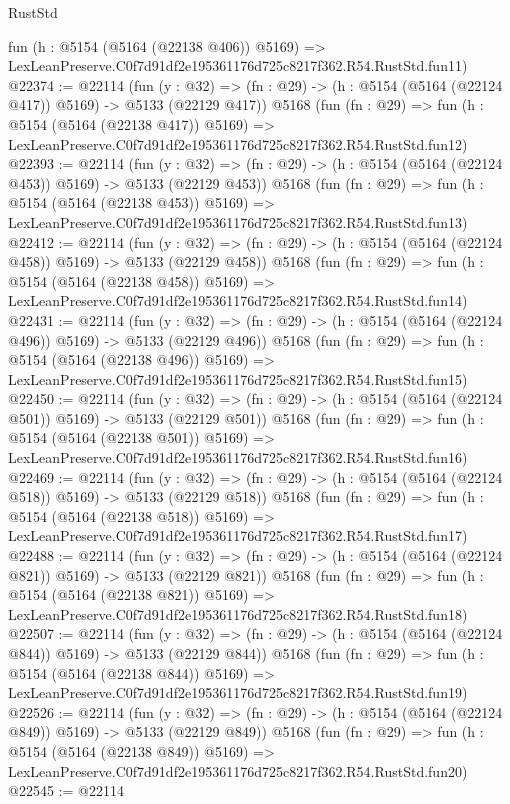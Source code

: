 \begin{lexlean}{RustStd}
\begin{coremodule}
    fun (h : @5154 (@5164 (@22138 @406)) @5169) =>
    LexLeanPreserve.C0f7d91df2e195361176d725c8217f362.R54.RustStd.fun11)
@22374 := @22114
    (fun (y : @32) => (fn : @29) -> (h : @5154 (@5164 (@22124 @417)) @5169) -> @5133 (@22129 @417))
    @5168
    (fun (fn : @29) =>
    fun (h : @5154 (@5164 (@22138 @417)) @5169) =>
    LexLeanPreserve.C0f7d91df2e195361176d725c8217f362.R54.RustStd.fun12)
@22393 := @22114
    (fun (y : @32) => (fn : @29) -> (h : @5154 (@5164 (@22124 @453)) @5169) -> @5133 (@22129 @453))
    @5168
    (fun (fn : @29) =>
    fun (h : @5154 (@5164 (@22138 @453)) @5169) =>
    LexLeanPreserve.C0f7d91df2e195361176d725c8217f362.R54.RustStd.fun13)
@22412 := @22114
    (fun (y : @32) => (fn : @29) -> (h : @5154 (@5164 (@22124 @458)) @5169) -> @5133 (@22129 @458))
    @5168
    (fun (fn : @29) =>
    fun (h : @5154 (@5164 (@22138 @458)) @5169) =>
    LexLeanPreserve.C0f7d91df2e195361176d725c8217f362.R54.RustStd.fun14)
@22431 := @22114
    (fun (y : @32) => (fn : @29) -> (h : @5154 (@5164 (@22124 @496)) @5169) -> @5133 (@22129 @496))
    @5168
    (fun (fn : @29) =>
    fun (h : @5154 (@5164 (@22138 @496)) @5169) =>
    LexLeanPreserve.C0f7d91df2e195361176d725c8217f362.R54.RustStd.fun15)
@22450 := @22114
    (fun (y : @32) => (fn : @29) -> (h : @5154 (@5164 (@22124 @501)) @5169) -> @5133 (@22129 @501))
    @5168
    (fun (fn : @29) =>
    fun (h : @5154 (@5164 (@22138 @501)) @5169) =>
    LexLeanPreserve.C0f7d91df2e195361176d725c8217f362.R54.RustStd.fun16)
@22469 := @22114
    (fun (y : @32) => (fn : @29) -> (h : @5154 (@5164 (@22124 @518)) @5169) -> @5133 (@22129 @518))
    @5168
    (fun (fn : @29) =>
    fun (h : @5154 (@5164 (@22138 @518)) @5169) =>
    LexLeanPreserve.C0f7d91df2e195361176d725c8217f362.R54.RustStd.fun17)
@22488 := @22114
    (fun (y : @32) => (fn : @29) -> (h : @5154 (@5164 (@22124 @821)) @5169) -> @5133 (@22129 @821))
    @5168
    (fun (fn : @29) =>
    fun (h : @5154 (@5164 (@22138 @821)) @5169) =>
    LexLeanPreserve.C0f7d91df2e195361176d725c8217f362.R54.RustStd.fun18)
@22507 := @22114
    (fun (y : @32) => (fn : @29) -> (h : @5154 (@5164 (@22124 @844)) @5169) -> @5133 (@22129 @844))
    @5168
    (fun (fn : @29) =>
    fun (h : @5154 (@5164 (@22138 @844)) @5169) =>
    LexLeanPreserve.C0f7d91df2e195361176d725c8217f362.R54.RustStd.fun19)
@22526 := @22114
    (fun (y : @32) => (fn : @29) -> (h : @5154 (@5164 (@22124 @849)) @5169) -> @5133 (@22129 @849))
    @5168
    (fun (fn : @29) =>
    fun (h : @5154 (@5164 (@22138 @849)) @5169) =>
    LexLeanPreserve.C0f7d91df2e195361176d725c8217f362.R54.RustStd.fun20)
@22545 := @22114

\end{coremodule}
\end{lexlean}
